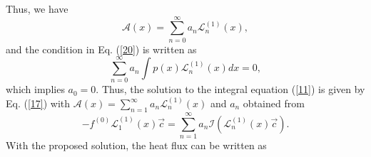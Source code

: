 \documentclass[11pt]{article} %
\begin{document}
Thus, we have 
\begin{equation}
\mathcal{A}\left(x\right)=\sum_{n=0}^{\infty}a_{n}\mathcal{L}_{n}^{\left(1\right)}\left(x\right),\label{24}
\end{equation}
and the condition in Eq. (\ref{20}) is written as 
\begin{equation}
\sum_{n=0}^{\infty}a_{n}\int p\left(x\right)\mathcal{L}_{n}^{\left(1\right)}\left(x\right)dx=0,\label{25}
\end{equation}
which implies $a_{0}=0$. Thus, the solution to the integral equation
(\ref{11}) is given by Eq. (\ref{17}) with $\mathcal{A}\left(x\right)=\sum_{n=1}^{\infty}a_{n}\mathcal{L}_{n}^{\left(1\right)}\left(x\right)$
and $a_{n}$ obtained from 
\begin{equation}
-f^{\left(0\right)}\mathcal{L}_{1}^{\left(1\right)}\left(x\right)\vec{c}=\sum_{n=1}^{\infty}a_{n}\mathcal{I}\left(\mathcal{L}_{n}^{\left(1\right)}\left(x\right)\vec{c}\right).\label{27}
\end{equation}
With the proposed solution, the heat flux can be written as
\end{document}
